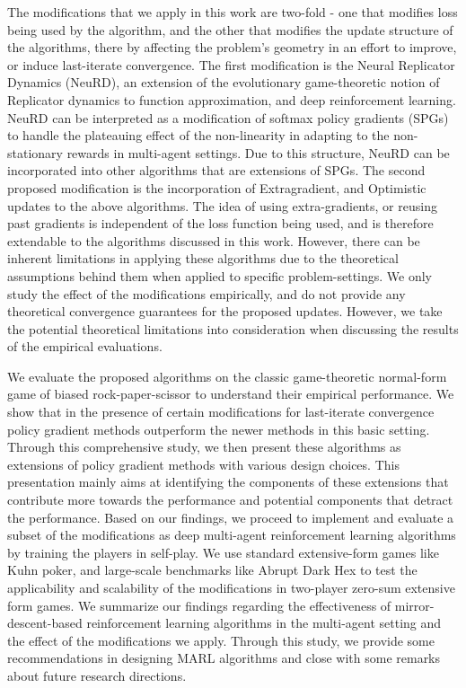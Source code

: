 The modifications that we apply in this work are two-fold - one that modifies loss being used by
the algorithm, and the other that modifies the update structure of the algorithms, there by
affecting the problem's geometry in an effort to improve, or induce last-iterate convergence.
The first modification is the Neural Replicator Dynamics (NeuRD), an extension of the evolutionary
game-theoretic notion of Replicator dynamics to function approximation, and deep reinforcement
learning.
NeuRD can be interpreted as a modification of softmax policy gradients (SPGs) to handle the
plateauing effect of the non-linearity in adapting to the non-stationary rewards in multi-agent
settings.
Due to this structure, NeuRD can be incorporated into other algorithms that are extensions of SPGs.
The second proposed modification is the incorporation of Extragradient, and Optimistic updates to
the above algorithms.
The idea of using extra-gradients, or reusing past gradients is independent of the loss function
being used, and is therefore extendable to the algorithms discussed in this work.
However, there can be inherent limitations in applying these algorithms due to the theoretical
assumptions behind them when applied to specific problem-settings.
We only study the effect of the modifications empirically, and do not provide any theoretical
convergence guarantees for the proposed updates.
However, we take the potential theoretical limitations into consideration when discussing the
results of the empirical evaluations.

We evaluate the proposed algorithms on the classic game-theoretic normal-form game of biased
rock-paper-scissor to understand their empirical performance.
We show that in the presence of certain modifications for last-iterate convergence policy gradient
methods outperform the newer methods in this basic setting.
Through this comprehensive study, we then present these algorithms as extensions of policy gradient
methods with various design choices.
This presentation mainly aims at identifying the components of these extensions that contribute
more towards the performance and potential components that detract the performance.
Based on our findings, we proceed to implement and evaluate a subset of the modifications as deep
multi-agent reinforcement learning algorithms by training the players in self-play.
We use standard extensive-form games like Kuhn poker, and large-scale benchmarks like Abrupt Dark
Hex to test the applicability and scalability of the modifications in two-player zero-sum extensive
form games.
We summarize our findings regarding the effectiveness of mirror-descent-based reinforcement
learning algorithms in the multi-agent setting and the effect of the modifications we apply.
Through this study, we provide some recommendations in designing MARL algorithms and close with
some remarks about future research directions.
